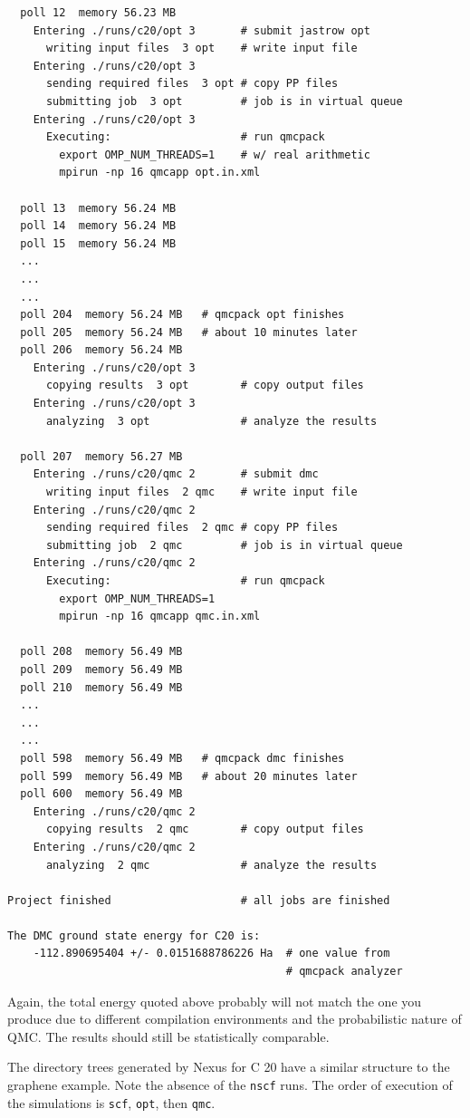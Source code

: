 \documentclass[oneside,11pt]{memoir}
\numberwithin{equation}{section}
\begin{document}
\begin{shaded}
\begin{verbatim}
  poll 12  memory 56.23 MB 
    Entering ./runs/c20/opt 3       # submit jastrow opt
      writing input files  3 opt    # write input file
    Entering ./runs/c20/opt 3 
      sending required files  3 opt # copy PP files
      submitting job  3 opt         # job is in virtual queue
    Entering ./runs/c20/opt 3 
      Executing:                    # run qmcpack
        export OMP_NUM_THREADS=1    # w/ real arithmetic
        mpirun -np 16 qmcapp opt.in.xml 

  poll 13  memory 56.24 MB 
  poll 14  memory 56.24 MB 
  poll 15  memory 56.24 MB 
  ...
  ...
  ...
  poll 204  memory 56.24 MB   # qmcpack opt finishes
  poll 205  memory 56.24 MB   # about 10 minutes later
  poll 206  memory 56.24 MB 
    Entering ./runs/c20/opt 3 
      copying results  3 opt        # copy output files
    Entering ./runs/c20/opt 3 
      analyzing  3 opt              # analyze the results

  poll 207  memory 56.27 MB 
    Entering ./runs/c20/qmc 2       # submit dmc
      writing input files  2 qmc    # write input file
    Entering ./runs/c20/qmc 2 
      sending required files  2 qmc # copy PP files
      submitting job  2 qmc         # job is in virtual queue
    Entering ./runs/c20/qmc 2 
      Executing:                    # run qmcpack
        export OMP_NUM_THREADS=1
        mpirun -np 16 qmcapp qmc.in.xml 

  poll 208  memory 56.49 MB 
  poll 209  memory 56.49 MB 
  poll 210  memory 56.49 MB 
  ...
  ...
  ...
  poll 598  memory 56.49 MB   # qmcpack dmc finishes
  poll 599  memory 56.49 MB   # about 20 minutes later
  poll 600  memory 56.49 MB 
    Entering ./runs/c20/qmc 2 
      copying results  2 qmc        # copy output files
    Entering ./runs/c20/qmc 2 
      analyzing  2 qmc              # analyze the results

Project finished                    # all jobs are finished
 
The DMC ground state energy for C20 is:
    -112.890695404 +/- 0.0151688786226 Ha  # one value from
                                           # qmcpack analyzer
\end{verbatim}
\end{shaded}

Again, the total energy quoted above probably will not match the one you produce 
due to different compilation environments and the probabilistic nature of 
QMC.  The results should still be statistically comparable.

The directory trees generated by Nexus for C 20 have a similar structure 
to the graphene example.  Note the absence of the \texttt{nscf} runs.  The order 
of execution of the simulations is \texttt{scf}, \texttt{opt}, then \texttt{qmc}.
\end{document}
